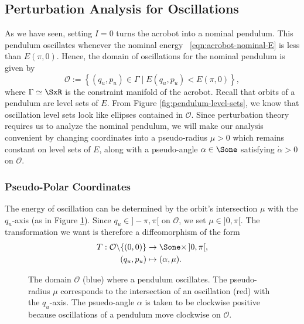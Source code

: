 \subsection{Perturbation Analysis for Oscillations}
As we have seen, setting \(I = 0\) turns the acrobot into a nominal pendulum. 
This pendulum oscillates whenever the nominal energy
~\eqref{eqn:acrobot-nominal-E} is less than \(E(\pi,0)\). 
Hence, the domain of oscillations for the nominal pendulum is given by
\[
    \mathcal{O} := \left\{ (q_u,p_u) \in \Gamma \mid E(q_u,p_u) < E(\pi,0)\right\}
    ,
\]
where \(\Gamma \simeq \SxR\) is the constraint manifold of the
acrobot.
Recall that orbits of a pendulum are level sets of \(E\). 
From Figure \ref{fig:pendulum-level-sets}, we know that oscillation level sets
look like ellipses contained in \(\mathcal{O}\).
Since perturbation theory requires us to analyze the nominal pendulum, we will
make our analysis convenient by changing coordinates into a
pseudo-radius \(\mu > 0\) which remains constant on level sets of \(E\), 
along with a pseudo-angle \(\alpha \in \Sone\) satisfying \(\dot{\alpha} > 0\) on
\(\mathcal{O}\).

\subsubsection*{Pseudo-Polar Coordinates}

The energy of oscillation can be determined by the orbit's intersection
\(\mu\) with the \(q_u\)-axis (as in Figure \ref{fig:mu-intersection}).
Since \(q_u \in ]-\pi,\pi[\) on \(\mathcal{O}\), we set \(\mu \in ]0,\pi[\).
The transformation we want is therefore a diffeomorphism of the form
\begin{align*}
    T : \mathcal{O} \backslash \{(0,0)\} &\rightarrow \Sone \times \, ]0,\pi[, \\
    (q_u, p_u) &\mapsto (\alpha,\mu)
    .
\end{align*}

\begin{figure}
    \centering
    
    \caption{The domain \(\mathcal{O}\) (blue) where a pendulum oscillates.
    The pseudo-radius \(\mu\) corresponds to the
    intersection of an oscillation (red) with the \(q_u\)-axis.
    The psuedo-angle \(\alpha\) is taken to be clockwise positive because 
    oscillations of a pendulum move clockwise on \(\mathcal{O}\).}
    \label{fig:mu-intersection}
\end{figure}

